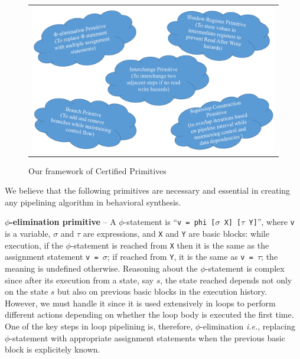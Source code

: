 \begin{figure}[t!]
\begin{center}
\begin{tabular}{c}
\includegraphics[width=5.5in]{fig-proposal/primitives}
\end{tabular}
\end{center}
\caption{Our framework of Certified Primitives}
\label{fig:primitives}
\end{figure}

We believe that the following primitives are necessary and essential in creating any pipelining
algorithm in behavioral synthesis.

{\textbf {$\phi$-elimination primitive}} -- A $\phi$-statement is ``{\tt v = phi
[$\sigma$ X] [$\tau$ Y]}'', where {\tt v} is a
variable, $\sigma$ and $\tau$ are expressions, and {\tt X}
and {\tt Y} are basic blocks: while execution, if the $\phi$-statement is
reached from {\tt X} then it
is the same as the assignment statement
{\tt v = $\sigma$}; if reached from {\tt Y}, it is the same as {\tt v = $\tau$};
the meaning is undefined otherwise.
Reasoning about the $\phi$-statement is complex since after its
execution from a state, say $s$, the state reached depends not only
on the state $s$ but also on previous basic blocks in the execution history.
However, we must handle it since it is used extensively in
loops to perform different actions depending on whether the
loop body is executed the first time. One of the key steps in loop pipelining is,
therefore, $\phi$-elimination {\em i.e.}, replacing
$\phi$-statement with appropriate assignment statements when the previous basic block is explicitely known.

